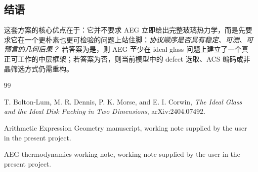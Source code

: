 \documentclass[12pt]{ctexart}
\begin{document}
\subsection{结语}

这套方案的核心优点在于：它并不要求 AEG 立即给出完整玻璃热力学，而是先要求它在一个更朴素也更可检验的问题上站住脚：\emph{协议顺序是否具有稳定、可测、可预言的几何后果？} 若答案为是，则 AEG 至少在 ideal glass 问题上建立了一个真正可工作的中层框架；若答案为否，则当前模型中的 defect 选取、ACS 编码或非晶筛选方式仍需重构。

\begin{thebibliography}{99}

T. Bolton-Lum, M. R. Dennis, P. K. Morse, and E. I. Corwin,
\emph{The Ideal Glass and the Ideal Disk Packing in Two Dimensions},
arXiv:2404.07492.

Arithmetic Expression Geometry manuscript,
working note supplied by the user in the present project.

AEG thermodynamics working note,
working note supplied by the user in the present project.

\end{thebibliography}
\end{document}
